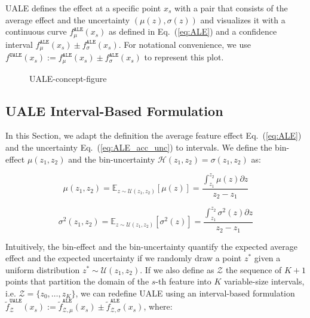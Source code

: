 \documentclass[twoside]{article}
\begin{document}
UALE defines the effect at a specific point \(x_s\) with a pair that
consists of the average effect and the uncertainty
\((\mu(z), \sigma(z))\) and visualizes it with a continuous curve
\(f^{\mathtt{ALE}}_{\mu}(x_s) \) as defined in Eq.~(\ref{eq:ALE}) and
a confidence interval
\(f^{\mathtt{ALE}}_{\mu}(x_s) \pm
f^{\mathtt{ALE}}_{\sigma}(x_s)\). For notational convenience, we use
\(f^{\mathtt{UALE}}(x_s) := f^{\mathtt{ALE}}_{\mu}(x_s) \pm
f^{\mathtt{ALE}}_{\sigma}(x_s)\) to represent this plot.

\begin{figure}
  \centering
  
  \caption{UALE-concept-figure}
  \label{fig:UALE-figure}
\end{figure}

\subsection{UALE Interval-Based Formulation}
\label{sec:UALE-definition-2}

In this Section, we adapt the definition the average feature effect
Eq.~(\ref{eq:ALE}) and the uncertainty Eq.~(\ref{eq:ALE_acc_unc}) to
intervals. We define the bin-effect \(\mu(z_1, z_2)\) and the
bin-uncertainty \(\mathcal{H}(z_1, z_2) = \sigma(z_1, z_2)\) as:

\begin{equation}
  \label{eq:mu_bin}
    \mu(z_1, z_2) = \mathbb{E}_{z \sim \mathcal{U}(z_1,z_2)} [\mu(z)]
    = \frac{\int_{z_1}^{z_2} \mu(z) \partial z}{z_2 - z_1}
\end{equation}

\begin{equation}
  \label{eq:var_bin}
  \sigma^2(z_1, z_2) = \mathbb{E}_{z \sim \mathcal{U}(z_1,z_2)} [\sigma^2(z)] =  \frac{\int_{z_1}^{z_2} \sigma^2(z)  \partial z}{z_2 - z_1}
\end{equation}

%
Intuitively, the bin-effect and the bin-uncertainty quantify
the expected average effect and the expected uncertainty if we
randomly draw a point \(z^*\) given a uniform distribution
\(z^* \sim \mathcal{U}(z_1, z_2)\). If we also define as
\(\mathcal{Z}\) the sequence of \(K+1\) points that partition the
domain of the \(s\)-th feature into \(K\) variable-size intervals,
i.e.  \(\mathcal{Z} = \{z_0, \ldots, z_K\}\), we can redefine UALE
using an interval-based formulation
\(\tilde{f}^{\mathtt{UALE}}_{\mathcal{Z}}(x_s):= \tilde{f}^{\mathtt{ALE}}_{\mathcal{Z}, \mu}(x_s)
\pm \tilde{f}^{\mathtt{ALE}}_{\mathcal{Z}, \sigma}(x_s)\), where:
\end{document}
